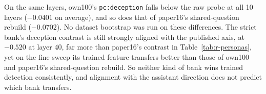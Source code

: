 On the same layers, own100's \texttt{pc:deception} falls below the raw probe at all 10 layers ($-0.0401$ on average), and so does that of paper16's shared-question rebuild ($-0.0702$). %
No dataset bootstrap was run on these differences. %
The strict bank's deception contrast is still strongly aligned with the published axis, at $-0.520$ at layer 40, far more than paper16's contrast in Table~\ref{tab:r-personas}, yet on the fine sweep its trained feature transfers better than those of own100 and paper16's shared-question rebuild. %
So neither kind of bank wins trained detection consistently, and alignment with the assistant direction does not predict which bank transfers. %

